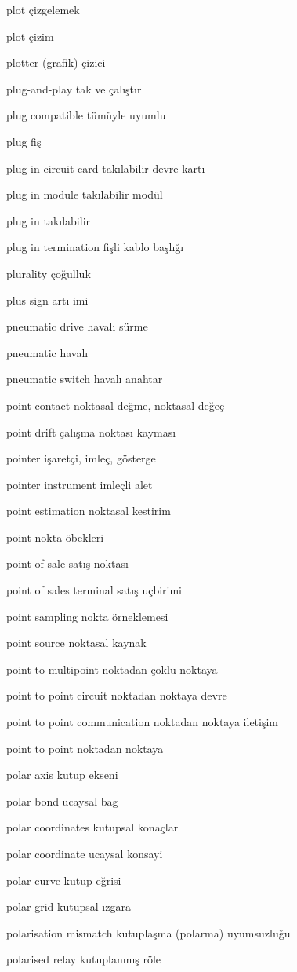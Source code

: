 \documentclass[12pt,fleqn]{article}\usepackage{../../common}
\begin{document}
plot çizgelemek

plot çizim

plotter (grafik) çizici

plug-and-play tak ve çalıştır

plug compatible tümüyle uyumlu

plug fiş

plug in circuit card takılabilir devre kartı

plug in module takılabilir modül

plug in takılabilir

plug in termination fişli kablo başlığı

plurality çoğulluk

plus sign artı imi

pneumatic drive havalı sürme

pneumatic havalı

pneumatic switch havalı anahtar

point contact noktasal değme, noktasal değeç

point drift çalışma noktası kayması

pointer işaretçi, imleç, gösterge

pointer instrument imleçli alet

point estimation noktasal kestirim

point nokta öbekleri

point of sale satış noktası

point of sales terminal satış uçbirimi

point sampling nokta örneklemesi

point source noktasal kaynak

point to multipoint noktadan çoklu noktaya

point to point circuit noktadan noktaya devre

point to point communication noktadan noktaya iletişim

point to point noktadan noktaya

polar axis kutup ekseni

polar bond ucaysal bag

polar coordinates kutupsal konaçlar

polar coordinate ucaysal konsayi

polar curve kutup eğrisi

polar grid kutupsal ızgara

polarisation mismatch kutuplaşma (polarma) uyumsuzluğu

polarised relay kutuplanmış röle
\end{document}
